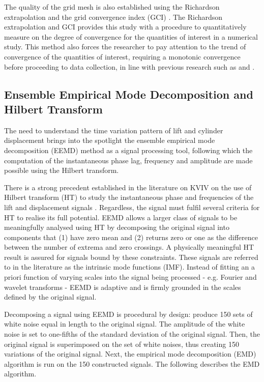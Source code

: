 \documentclass[oneside]{utmthesis}
\begin{document}
The quality of the grid mesh is also established using the Richardson extrapolation and the grid convergence index (GCI) \citep{Stern2001}. The Richardson extrapolation \citep{Richardson1927} and GCI provides this study with a procedure to quantitatively measure on the degree of convergence for the quantities of interest in a numerical study. This method also forces the researcher to pay attention to the trend of convergence of the quantities of interest, requiring a monotonic convergence before proceeding to data collection, in line with previous research such as \citet{MatAli2011} and \citet{Maruai2018}.

\subsection{Ensemble Empirical Mode Decomposition and Hilbert Transform} \label{ssec:eemd}
The need to understand the time variation pattern of lift and cylinder displacement brings into the spotlight the ensemble empirical mode decomposition (EEMD) method \citep{Huang1998,Wu2008} as a signal processing tool, following which the computation of the instantaneous phase lag, frequency and amplitude are made possible using the Hilbert transform.

There is a strong precedent established in the literature on KVIV on the use of Hilbert transform (HT) to study the instantaneous phase and frequencies of the lift and displacement signals \citep{Khalak1999}. Regardless, the signal must fulfil several criteria for HT to realise its full potential. EEMD allows a larger class of signals to be meaningfully analysed using HT by decomposing the original signal into components that (1) have zero mean and (2) returns zero or one as the difference between the number of extrema and zero crossings. A physically meaningful HT result is assured for signals bound by these constraints. These signals are referred to in the literature as the intrinsic mode functions (IMF). Instead of fitting an a priori function of varying scales into the signal being processed - e.g. Fourier and wavelet transforms - EEMD is adaptive and is firmly grounded in the scales defined by the original signal.

Decomposing a signal using EEMD is procedural by design: produce 150 sets of white noise equal in length to the original signal. The amplitude of the white noise is set to one-fifths of the standard deviation of the original signal. Then, the original signal is superimposed on the set of white noises, thus creating 150 variations of the original signal. Next, the empirical mode decomposition (EMD) algorithm is run on the 150 constructed signals. The following describes the EMD algorithm.
\end{document}
